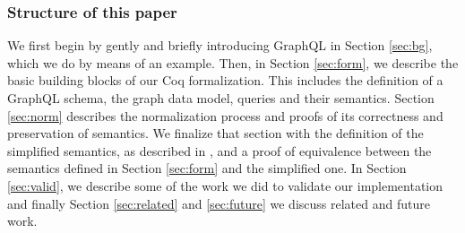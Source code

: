 \subsubsection*{Structure of this paper}

We first begin by gently and briefly introducing GraphQL in Section \ref{sec:bg}, which we do by means of an example. Then, in Section \ref{sec:form}, we describe the basic building blocks of our Coq formalization. This includes the definition of a GraphQL schema, the graph data model, queries and their semantics. Section \ref{sec:norm} describes the normalization process and proofs of its correctness and preservation of semantics. We finalize that section with the definition of the simplified semantics, as described in \HP, and a proof of equivalence between the semantics defined in Section \ref{sec:form} and the simplified one. In Section \ref{sec:valid}, we describe some of the work we did to validate our implementation and finally Section \ref{sec:related} and \ref{sec:future} we discuss related and future work.
